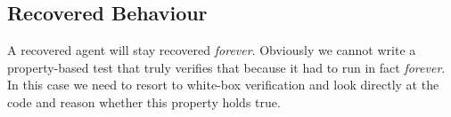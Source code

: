 \subsection{Recovered Behaviour}
A recovered agent will stay recovered \textit{forever}. Obviously we cannot write a property-based test that truly verifies that because it had to run in fact \textit{forever}. In this case we need to resort to white-box verification and look directly at the code and reason whether this property holds true.